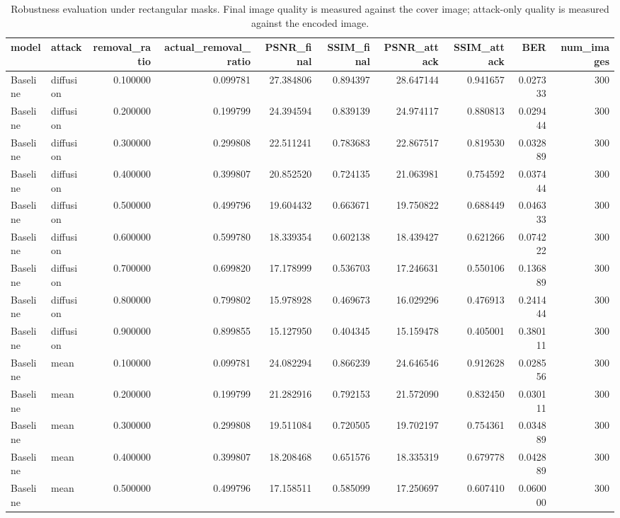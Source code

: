 
\begin{table}[h]
\centering

\caption{Robustness evaluation under rectangular masks. Final image quality is measured against the cover image; attack-only quality is measured against the encoded image.}
\label{tab:rectangular}

\begin{tabular}{llrrrrrrrr}
\toprule
model & attack & removal\_ratio & actual\_removal\_ratio & PSNR\_final & SSIM\_final & PSNR\_attack & SSIM\_attack & BER & num\_images \\
\midrule
Baseline & diffusion & 0.100000 & 0.099781 & 27.384806 & 0.894397 & 28.647144 & 0.941657 & 0.027333 & 300 \\
Baseline & diffusion & 0.200000 & 0.199799 & 24.394594 & 0.839139 & 24.974117 & 0.880813 & 0.029444 & 300 \\
Baseline & diffusion & 0.300000 & 0.299808 & 22.511241 & 0.783683 & 22.867517 & 0.819530 & 0.032889 & 300 \\
Baseline & diffusion & 0.400000 & 0.399807 & 20.852520 & 0.724135 & 21.063981 & 0.754592 & 0.037444 & 300 \\
Baseline & diffusion & 0.500000 & 0.499796 & 19.604432 & 0.663671 & 19.750822 & 0.688449 & 0.046333 & 300 \\
Baseline & diffusion & 0.600000 & 0.599780 & 18.339354 & 0.602138 & 18.439427 & 0.621266 & 0.074222 & 300 \\
Baseline & diffusion & 0.700000 & 0.699820 & 17.178999 & 0.536703 & 17.246631 & 0.550106 & 0.136889 & 300 \\
Baseline & diffusion & 0.800000 & 0.799802 & 15.978928 & 0.469673 & 16.029296 & 0.476913 & 0.241444 & 300 \\
Baseline & diffusion & 0.900000 & 0.899855 & 15.127950 & 0.404345 & 15.159478 & 0.405001 & 0.380111 & 300 \\
Baseline & mean & 0.100000 & 0.099781 & 24.082294 & 0.866239 & 24.646546 & 0.912628 & 0.028556 & 300 \\
Baseline & mean & 0.200000 & 0.199799 & 21.282916 & 0.792153 & 21.572090 & 0.832450 & 0.030111 & 300 \\
Baseline & mean & 0.300000 & 0.299808 & 19.511084 & 0.720505 & 19.702197 & 0.754361 & 0.034889 & 300 \\
Baseline & mean & 0.400000 & 0.399807 & 18.208468 & 0.651576 & 18.335319 & 0.679778 & 0.042889 & 300 \\
Baseline & mean & 0.500000 & 0.499796 & 17.158511 & 0.585099 & 17.250697 & 0.607410 & 0.060000 & 300 \\

\end{tabular}
\end{table}
